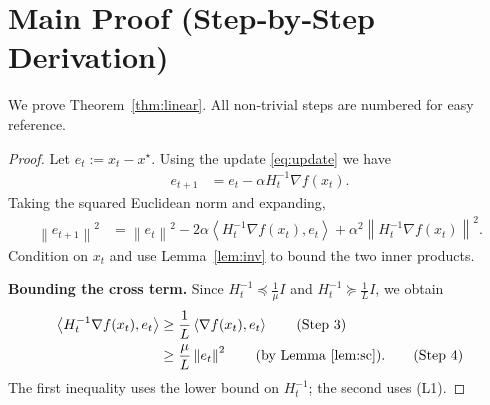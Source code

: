 \documentclass{article}
\newcommand{\norm}[1]{\left\lVert #1\right\rVert}
\newcommand{\ip}[2]{\left\langle #1,#2\right\rangle}
\begin{document}
\section*{Main Proof (Step‑by‑Step Derivation)}
We prove Theorem~\ref{thm:linear}.  All non‑trivial steps are numbered for easy reference.

\begin{proof}
Let $e_t:=x_t-x^{\star}$.  Using the update \eqref{eq:update} we have
\begin{align}
   e_{t+1}
   &= e_t - \alpha H_t^{-1}\nabla f(x_t). \tag{Step 1}
\end{align}
Taking the squared Euclidean norm and expanding,
\begin{align}
   \norm{e_{t+1}}^{2}
   &= \norm{e_t}^{2}
      -2\alpha\ip{H_t^{-1}\nabla f(x_t)}{e_t}
      +\alpha^{2}\norm{H_t^{-1}\nabla f(x_t)}^{2}. \tag{Step 2}
\end{align}
Condition on $x_t$ and use Lemma~\ref{lem:inv} to bound the two inner products.

\medskip\noindent\textbf{Bounding the cross term.}
Since $H_t^{-1}\preceq\frac{1}{\mu}I$ and $H_t^{-1}\succeq\frac{1}{L}I$, we obtain
\begin{align}
   \ip{H_t^{-1}\nabla f(x_t)}{e_t}
   &\ge \frac{1}{L}\ip{\nabla f(x_t)}{e_t} \tag{Step 3}\\
   &\ge \frac{\mu}{L}\norm{e_t}^{2} \qquad\text{(by Lemma~\ref{lem:sc})}. \tag{Step 4}
\end{align}
The first inequality uses the lower bound on $H_t^{-1}$; the second uses (L1).


\end{proof}
\end{document}
